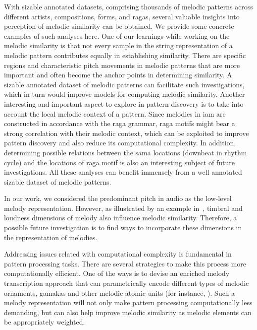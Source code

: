 With sizable annotated datasets, comprising thousands of melodic patterns across different artists, compositions, forms, and \glspl{raga}, several valuable insights into perception of melodic similarity can be obtained. We provide some concrete examples of such analyses here. One of our learnings while working on the melodic similarity is that not every sample in the string representation of a melodic pattern contributes equally in establishing similarity. There are specific regions and characteristic pitch movements in melodic patterns that are more important and often become the anchor points in determining similarity. A sizable annotated dataset of melodic patterns can facilitate such investigations, which in turn would improve models for computing melodic similarity. Another interesting and important aspect to explore in pattern discovery is to take into account the local melodic context of a pattern. Since melodies in \gls{iam} are constructed in accordance with the \gls{raga} grammar, \gls{raga} motifs might bear a strong correlation with their melodic context, which can be exploited to improve pattern discovery and also reduce its computational complexity. In addition, determining possible relations between the \gls{sama} locations (downbeat in rhythm cycle) and the locations of \gls{raga} motif is also an interesting subject of future investigations. All these analyses can benefit immensely from a well annotated sizable dataset of melodic patterns.

In our work, we considered the predominant pitch in audio as the low-level melody representation. However, as illustrated by an example in~, timbral and loudness dimensions of melody also influence melodic similarity. Therefore, a possible future investigation is to find ways to incorporate these dimensions in the representation of melodies.

Addressing issues related with computational complexity is fundamental in pattern processing tasks. There are several strategies to make this process more computationally efficient. One of the ways is to devise an enriched melody transcription approach that can parametrically encode different types of melodic ornaments, \glspl{gamaka} and other melodic atomic units (for instance, \cite{widdess1994involving,rao1999raga}). Such a melody representation will not only make pattern processing computationally less demanding, but can also help improve melodic similarity as melodic elements can be appropriately weighted.

